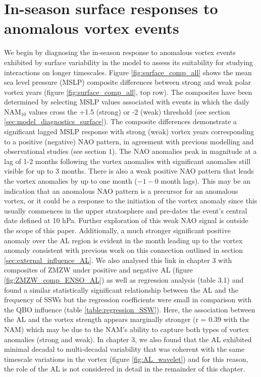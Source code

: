 \section{In-season surface responses to anomalous vortex events}
We begin by diagnosing the in-season response to anomalous vortex events exhibited by surface variability in the model to assess its suitability for studying interactions on longer timescales. Figure \ref{fig:surface_comp_all} shows the mean sea level pressure (MSLP) composite differences between strong and weak polar vortex years (figure \ref{fig:surface_comp_all}, top row). The composites have been determined by selecting MSLP values associated with events in which the daily NAM$_{10}$ values cross the +1.5 (strong) or -2 (weak) threshold (see section \ref{sec:model_diagnostics_surface}). The composite differences demonstrate a significant lagged MSLP response with strong (weak) vortex years  corresponding to a positive (negative) NAO pattern, in agreement with previous modelling and observational studies (see section 1). The NAO anomalies peak in magnitude at a lag of 1-2 months following the vortex anomalies with significant anomalies still visible for up to 3 months. There is also a weak positive NAO pattern that leads the vortex anomalies by up to one month ($-1 - 0$ month lags). This may be an indication that an anomalous NAO pattern is a precursor for an anomalous vortex, or it could be a response to the initiation of the vortex anomaly since this usually commences in the upper stratosphere and pre-dates the event's central date defined at 10 hPa. Further exploration of this weak NAO signal is outside the scope of this paper. Additionally, a much stronger significant positive anomaly over the AL region is evident in the month leading up to the vortex anomaly consistent with previous work on this connection outlined in section \ref{sec:external_influence_AL}. We also analysed this link in chapter 3 with composites of ZMZW under positive and negative AL (figure \ref{fig:ZMZW_comp_ENSO_AL}) as well as regression analysis (table 3.1) and found a similar statistically significant relationship between the AL and the frequency of SSWs but the regression coefficients were small in comparison with the QBO influence (table \ref{table:regression_SSW}). Here, the association between the AL and the vortex strength appears marginally stronger (r = 0.39 with the NAM) which may be due to the NAM's ability to capture both types of vortex anomalies (strong and weak). In chapter 3, we also found that the AL exhibited minimal decadal to multi-decadal variability that was coherent with the same timescale variations in the vortex (figure \ref{fig:AL_wavelet}) and for this reason, the role of the AL is not considered in detail in the remainder of this chapter.

